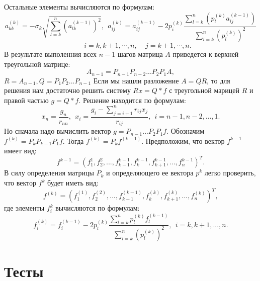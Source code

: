 \documentclass[14pt, titlepage,fleqn]{extarticle}
\begin{document}
	Остальные элементы вычисляются по формулам:
	\[a^{(k)}_{kk} = -\sigma_k \sqrt{\sum^{n}_{l=k}(a^{(k-1)}_{lk})^2}, ~~ a^{(k)}_{ij} = a^{(k-1)}_{ij} - 2p^{(k)}_{i} \dfrac{\sum^{n}_{l=k}(p^{(k)}_{l}a^{(k-1)}_{lj})}{\sum^{n}_{l=k}(p^{(k)}_{l})^2}\]
	\[~~~~~~~~~i = k, k+1, \cdots, n,~~~~~j=k+1,\cdots,n.\]
	\newpage
	В результате выполенния всех $n-1$ шагов матрица $A$ приведется к верхней треугольной матрице:
	\[A_{n-1} = P_{n-1}P_{n-2}...P_2P_1A,\]
	$R = A_{n-1}, Q = P_1P_2...P_{n-1}$
	Если мы нашли разложение $A = QR$, то для решения нам достаточно решить систему $Rx= Q*f$ с треугольной марицей $R$ и правой частью $g=Q*f$. Решение находится по формулам:
	\[x_n = \dfrac{g_n}{r_{nn}},~~ x_i = \dfrac{g_i - \sum^{n}_{j=i+1}r_{ij}x_j}{r_{ij}}, ~~i = n-1, n-2,...,1.\]
	Но сначала надо вычислить вектор $g = P_{n-1}...P_2P_1f.$ Обозначим $f^{(k)} = P_kP_{k-1}P_1f.$ Тогда $f^{(k)} = P_kf^{(k-1)}.$ Предположим, что вектор $f^{k-1}$ имеет вид:
	\[f^{k-1} = (f^{1}_{1}, f^{2}_{2},...,f^{k-1}_{k-1},f^{k-1}_{k},f^{k-1}_{k+1},...,f^{k-1}_{n})^T.\]
	В силу определения матрицы $P_k$ и определяющего ее вектора $p^k$ легко проверить, что вектор $f^k$ будет иметь вид:
	\[f^{(k)} = (f^{(1)}_{1}, f^{(2)}_{2}, ..., f^{(k-1)}_{k-1}, f^{(k)}_{k}, f^{(k)}_{k+1},...,f^{(k)}_{n})^T,\]
	где элементы $f^k_i$ вычисляются по формулам:
	\[f^{(k)}_{i} = f^{(k - 1)}_{i} - 2p^{(k)}_{l} \dfrac{\sum^{n}_{l=k}p^{(k)}_{l}f^{(k-1)}_{l}}{\sum^{n}_{l=k}(p^{(k)}_{l})^2},~~ i = k,k+1,...,n.\]
	\newpage
	\section*{Тесты}
	
	
\end{document}
